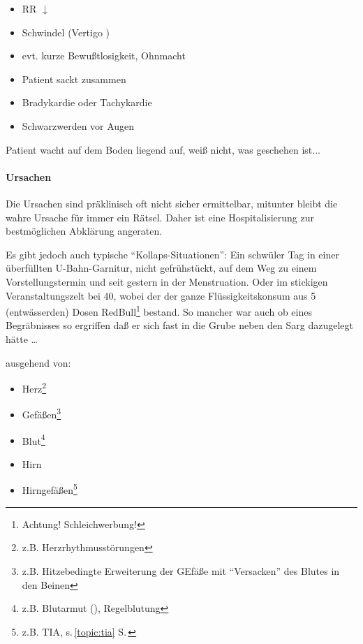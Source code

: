 \begin{itemize}
    \item RR ${\downarrow}$
    \item Schwindel (Vertigo )
    \item evt. kurze Bewu{\ss}tlosigkeit, Ohnmacht
    \item Patient sackt zusammen
    \item Bradykardie oder Tachykardie
    \item Schwarzwerden vor Augen
\end{itemize}

Patient wacht auf dem Boden liegend  auf, wei{\ss} nicht, was geschehen
ist...

\paragraph{Ursachen} Die Ursachen sind präklinisch oft
nicht sicher ermittelbar, mitunter bleibt die wahre Ursache
für immer ein Rätsel. Daher ist eine Hospitalisierung zur
bestmöglichen Abklärung angeraten. 

Es gibt jedoch auch typische "`Kollaps-Situationen"': Ein
schwüler Tag in einer überfüllten U-Bahn-Garnitur, nicht
gefrühstückt, auf dem Weg zu einem Vorstellungstermin und
seit gestern in der Menstruation. Oder im stickigen
Veranstaltungszelt bei 40\textdegree , wobei der der ganze
Flüssigkeitskonsum aus 5 (entwässerden) Dosen
RedBull\texttrademark\footnote{Achtung! Schleichwerbung!}
bestand. So mancher war auch ob eines Begräbnisses so
ergriffen daß er sich fast in die Grube neben den Sarg
dazugelegt hätte \ldots 

ausgehend von:

\begin{itemize}
    \item Herz\footnote{z.B. Herzrhythmusstörungen}
    \item Gefäßen\footnote{z.B. Hitzebedingte Erweiterung
    der GEfäße mit "`Versacken"' des Blutes in den Beinen}
    \item Blut\footnote{z.B. Blutarmut (),
    Regelblutung}
    \item Hirn
    \item Hirngefäßen\footnote{z.B. TIA, s.\,\ref{topic:tia}
    S.\,\pageref{topic:tia}}
\end{itemize}


